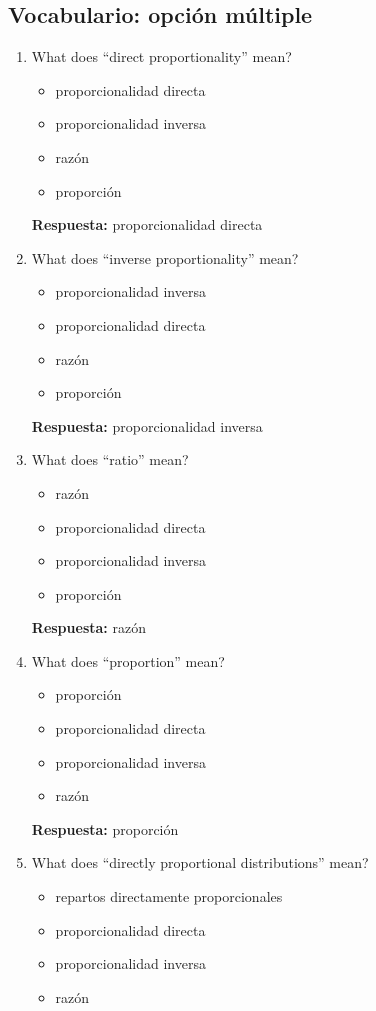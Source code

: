 \documentclass[11pt,a4paper]{article}
\begin{document}
\subsection{Vocabulario: opci\'on m\'ultiple}
\begin{enumerate}
\item What does ``direct proportionality'' mean?
\begin{itemize}
\item proporcionalidad directa
\item proporcionalidad inversa
\item razón
\item proporción
\end{itemize}
\textbf{Respuesta:} proporcionalidad directa
\item What does ``inverse proportionality'' mean?
\begin{itemize}
\item proporcionalidad inversa
\item proporcionalidad directa
\item razón
\item proporción
\end{itemize}
\textbf{Respuesta:} proporcionalidad inversa
\item What does ``ratio'' mean?
\begin{itemize}
\item razón
\item proporcionalidad directa
\item proporcionalidad inversa
\item proporción
\end{itemize}
\textbf{Respuesta:} razón
\item What does ``proportion'' mean?
\begin{itemize}
\item proporción
\item proporcionalidad directa
\item proporcionalidad inversa
\item razón
\end{itemize}
\textbf{Respuesta:} proporción
\item What does ``directly proportional distributions'' mean?
\begin{itemize}
\item repartos directamente proporcionales
\item proporcionalidad directa
\item proporcionalidad inversa
\item razón

\end{itemize}
\end{enumerate}
\end{document}

